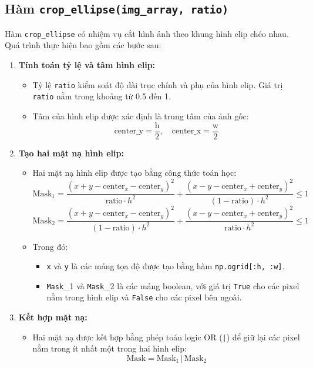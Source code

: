 \subsection{Hàm \texttt{crop\_ellipse(img\_array, ratio)}}
Hàm \texttt{crop\_ellipse} có nhiệm vụ cắt hình ảnh theo khung hình elip chéo nhau. Quá trình thực hiện bao gồm các bước sau:

\begin{enumerate}

	\item \textbf{Tính toán tỷ lệ và tâm hình elip:}
	      \begin{itemize}
		      \item Tỷ lệ \texttt{ratio} kiểm soát độ dài trục chính và phụ của hình elip. Giá trị \texttt{ratio} nằm trong khoảng từ 0.5 đến 1.
		      \item Tâm của hình elip được xác định là trung tâm của ảnh gốc:
		            \[
			            \text{center\_y} = \frac{\text{h}}{2}, \quad \text{center\_x} = \frac{\text{w}}{2}
		            \]
	      \end{itemize}

	\item \textbf{Tạo hai mặt nạ hình elip:}
	      \begin{itemize}
		      \item Hai mặt nạ hình elip được tạo bằng công thức toán học:
		            \[
			            \text{Mask}_1 = \frac{(x + y - \text{center}_x - \text{center}_y)^2}{\text{ratio} \cdot h^2} + \frac{(x - y - \text{center}_x + \text{center}_y)^2}{(1 - \text{ratio}) \cdot h^2} \leq 1
		            \]
		            \[
			            \text{Mask}_2 = \frac{(x + y - \text{center}_x - \text{center}_y)^2}{(1 - \text{ratio}) \cdot h^2} + \frac{(x - y - \text{center}_x + \text{center}_y)^2}{\text{ratio} \cdot h^2} \leq 1
		            \]
		      \item Trong đó:
		            \begin{itemize}
			            \item \texttt{x} và \texttt{y} là các mảng tọa độ được tạo bằng hàm \texttt{np.ogrid[:h, :w]}.
			            \item \texttt{Mask}\_1 và \texttt{Mask}\_2 là các mảng boolean, với giá trị \texttt{True} cho các pixel nằm trong hình elip và \texttt{False} cho các pixel bên ngoài.
		            \end{itemize}
	      \end{itemize}

	\item \textbf{Kết hợp mặt nạ:}
	      \begin{itemize}
		      \item Hai mặt nạ được kết hợp bằng phép toán logic OR (\texttt{|}) để giữ lại các pixel nằm trong ít nhất một trong hai hình elip:
		            \[
			            \text{Mask} = \text{Mask}_1 \, | \, \text{Mask}_2
		            \]
	      \end{itemize}


\end{enumerate}
